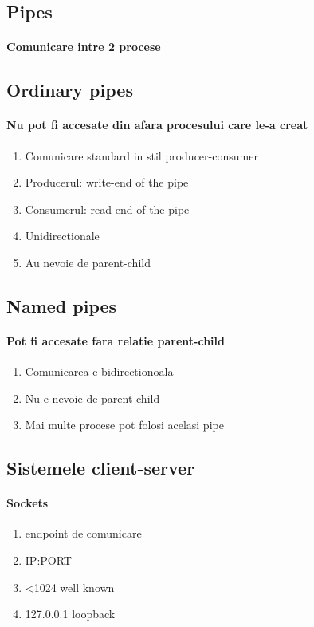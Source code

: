 \documentclass{article}
\begin{document}
\subsection*{Pipes}
\paragraph*{Comunicare intre 2 procese}
\subsection*{Ordinary pipes}
\paragraph*{Nu pot fi accesate din afara procesului care le-a creat}
\begin{enumerate}
    \item Comunicare standard in stil producer-consumer
    \item Producerul: write-end of the pipe
    \item Consumerul: read-end of the pipe
    \item Unidirectionale
    \item Au nevoie de parent-child
\end{enumerate}

\subsection*{Named pipes}
\paragraph*{Pot fi accesate fara relatie parent-child}
\begin{enumerate}
    \item Comunicarea e bidirectionoala
    \item Nu e nevoie de parent-child
    \item Mai multe procese pot folosi acelasi pipe
\end{enumerate}

\subsection*{Sistemele client-server}
\paragraph*{Sockets}
\begin{enumerate}
    \item endpoint de comunicare
    \item IP:PORT
    \item <1024 well known
    \item 127.0.0.1 loopback
\end{enumerate}
\end{document}
